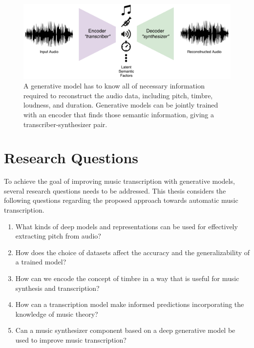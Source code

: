 \begin{figure}[t]
	\includegraphics[width=\textwidth]{autoencoder.pdf}
	\caption{A generative model has to know all of necessary information required to reconstruct the audio data, including pitch, timbre, loudness, and duration. Generative models can be jointly trained with an encoder that finds those semantic information, giving a transcriber-synthesizer pair.}
	\label{fig:autoencoder}
\end{figure}

\pagebreak

\section{Research Questions}\label{sec:subproblems}

To achieve the goal of improving music transcription with generative models, several research questions needs to be addressed. This thesis considers the following questions regarding the proposed approach towards automatic music transcription.

\vspace{1em}

\begin{enumerate}
\item What kinds of deep models and representations can be used for effectively extracting pitch from audio?
\item How does the choice of datasets affect the accuracy and the generalizability of a trained model?
\item How can we encode the concept of timbre in a way that is useful for music synthesis and transcription?
\item How can a transcription model make informed predictions incorporating the knowledge of music theory?
\item Can a music synthesizer component based on a deep generative model be used to improve music transcription?
\end{enumerate}

\vspace{1em}

